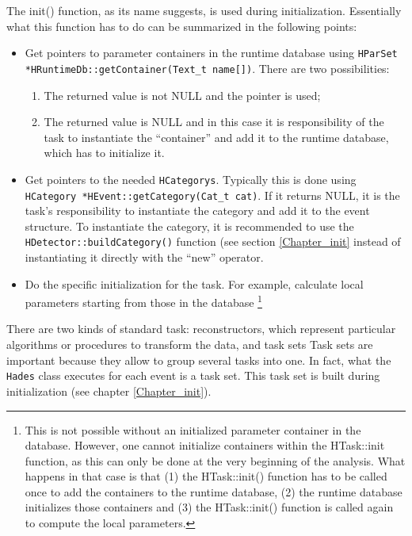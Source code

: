 The init() function, as its name suggests, is used during initialization. Essentially 
what this function has to do can be summarized in the following points:
\begin{itemize}
    \item Get pointers to parameter containers in the runtime database using 
    \newline
    \verb+HParSet *HRuntimeDb::getContainer(Text_t name[])+. There are two possibilities:
     \begin{enumerate}
        \item The returned value is not NULL and the pointer is used; 
        \item The returned value is NULL and in this case it is responsibility of the 
        task to instantiate the ``container'' and add it to the runtime database, which 
        has to initialize it. 
      \end{enumerate}
      
    \item Get pointers to the needed \verb+HCategorys+. Typically this is done using 
    \newline
    \verb+HCategory *HEvent::getCategory(Cat_t cat)+. If it returns NULL, it is the 
    task's responsibility to instantiate the category and add it to the event structure. 
    To instantiate the category, it is recommended to use the 
    \newline
    \verb+HDetector::buildCategory()+ function (see section \ref{Chapter_init} instead of 
    instantiating it directly with the ``new'' operator.
    \item  Do the specific initialization for the task. For example, calculate local parameters 
    starting from those in the database \footnote{This is not possible without an initialized 
    parameter container in the database. However, one cannot initialize containers within the 
    HTask::init function, as this can only be done at the very beginning of the analysis. What 
    happens in that case is that (1) the HTask::init() function has to be called once to add 
    the containers to the runtime database, (2) the runtime database initializes those containers 
    and (3) the HTask::init() function is called again to compute the local parameters.} 
\end{itemize}
There are two kinds of standard task: reconstructors, which represent particular algorithms or 
procedures to transform the data, and task sets 
Task sets are important because they allow to group several tasks into one. In fact, what the 
\verb+Hades+ class executes for each event is a task set. This task set is built during 
initialization (see chapter \ref{Chapter_init}).

